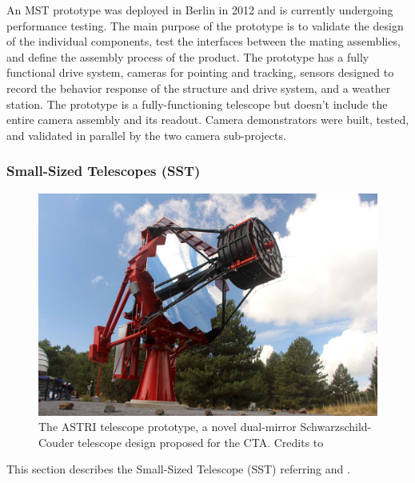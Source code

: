An MST prototype was deployed in Berlin in 2012 and is currently undergoing performance testing. The main purpose of the prototype is to validate the design of the individual components, test the interfaces between the mating assemblies, and define the assembly process of the product. The prototype has a fully functional drive system, cameras for pointing and tracking, sensors designed to record the behavior response of the structure and drive system, and a weather station. The prototype is a fully-functioning telescope but doesn't include the entire camera assembly and its readout. Camera demonstrators were built, tested, and validated in parallel by the two camera sub-projects.

\subsubsection{Small-Sized Telescopes (SST)}
\begin{figure}[t]
\centering
\includegraphics[width=0.9\linewidth]{figures/introduction/sst.jpg}
\caption{The ASTRI telescope prototype, a novel dual-mirror Schwarzschild-Couder telescope design proposed for the CTA. Credits to \cite{ctaobservatorywebsite}} 
\label{fig:sst}
\end{figure}
This section describes the Small-Sized Telescope (SST) referring \cite{Tagliaferri_2022} and \cite{ctaobservatorywebsitetechnology}.
